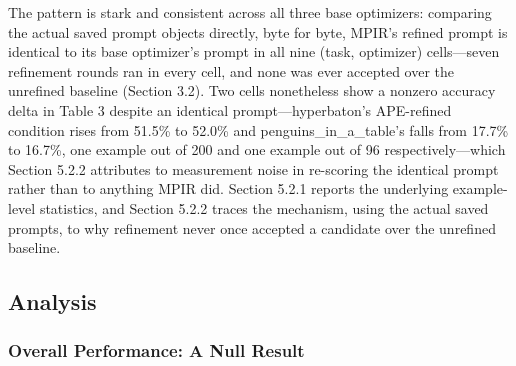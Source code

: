 \documentclass[a4paper,fleqn]{cas-sc}
\begin{document}
\begin{table}[htbp]
\centering
\small
\caption{Accuracy (\%) on the three go/no-go pilot tasks, Qwen3-1.7B as target, optimizer, and meta-prompting judge, single seed.}
\end{table}

The pattern is stark and consistent across all three base optimizers: comparing the actual saved prompt objects directly, byte for byte, MPIR's refined prompt is identical to its base optimizer's prompt in all nine (task, optimizer) cells---seven refinement rounds ran in every cell, and none was ever accepted over the unrefined baseline (Section 3.2). Two cells nonetheless show a nonzero accuracy delta in Table 3 despite an identical prompt---hyperbaton's APE-refined condition rises from 51.5\% to 52.0\% and penguins\_\allowbreak{}in\_\allowbreak{}a\_\allowbreak{}table's falls from 17.7\% to 16.7\%, one example out of 200 and one example out of 96 respectively---which Section 5.2.2 attributes to measurement noise in re-scoring the identical prompt rather than to anything MPIR did. Section 5.2.1 reports the underlying example-level statistics, and Section 5.2.2 traces the mechanism, using the actual saved prompts, to why refinement never once accepted a candidate over the unrefined baseline.

\subsection{Analysis}

\subsubsection{Overall Performance: A Null Result}
\end{document}
